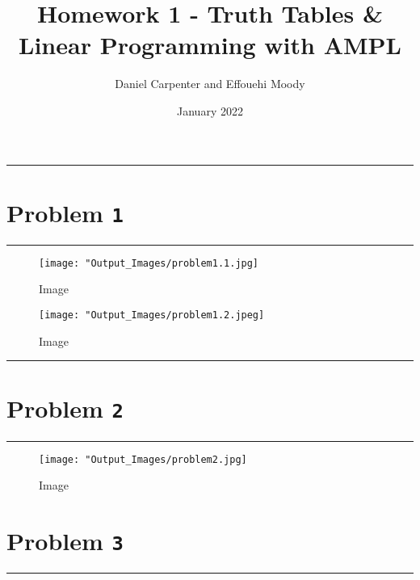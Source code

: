\documentclass[
  12pt,
]{article}
\title{Homework 1 - Truth Tables \& Linear Programming with AMPL}
\author{Daniel Carpenter and Effouehi Moody}
\date{January 2022}
\begin{document}
\maketitle

{
\setcounter{tocdepth}{2}
\tableofcontents
}
\begin{center}\rule{0.5\linewidth}{0.5pt}\end{center}

\hypertarget{problem-1}{%
\section{\texorpdfstring{Problem
\texttt{1}}{Problem 1}}\label{problem-1}}

\begin{center}\rule{0.5\linewidth}{0.5pt}\end{center}

\begin{figure}
\centering
\texttt{[image: "Output\_Images/problem1.1.jpg]}
\caption{Image}
\end{figure}

\begin{figure}
\centering
\texttt{[image: "Output\_Images/problem1.2.jpeg]}
\caption{Image}
\end{figure}

\begin{center}\rule{0.5\linewidth}{0.5pt}\end{center}

\hypertarget{problem-2}{%
\section{\texorpdfstring{Problem
\texttt{2}}{Problem 2}}\label{problem-2}}

\begin{center}\rule{0.5\linewidth}{0.5pt}\end{center}

\begin{figure}
\centering
\texttt{[image: "Output\_Images/problem2.jpg]}
\caption{Image}
\end{figure}

\hypertarget{problem-3}{%
\section{\texorpdfstring{Problem
\texttt{3}}{Problem 3}}\label{problem-3}}

\begin{center}\rule{0.5\linewidth}{0.5pt}\end{center}
\end{document}
